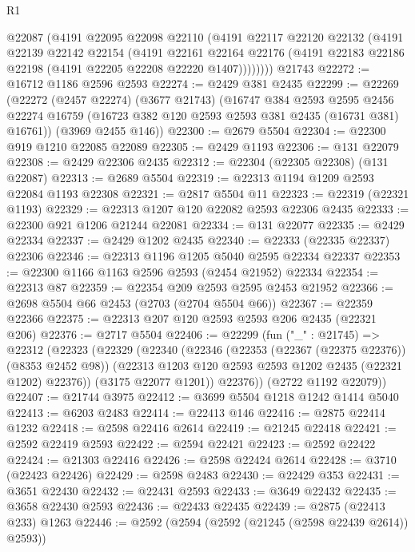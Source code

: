 \begin{lexlean}{R1}
\begin{coremodule}
        @22087
        (@4191
          @22095
          @22098
          @22110
          (@4191
            @22117
            @22120
            @22132
            (@4191
              @22139
              @22142
              @22154
              (@4191
                @22161
                @22164
                @22176
                (@4191 @22183 @22186 @22198 (@4191 @22205 @22208 @22220 @1407))))))))
    @21743
@22272 := @16712 @1186 @2596 @2593
@22274 := @2429 @381 @2435
@22299 := @22269
    (@22272
      (@2457 @22274)
      (@3677 @21743)
      (@16747
        @384
        @2593
        @2595
        @2456
        @22274
        @16759
        (@16723 @382 @120 @2593 @2593 @381 @2435 (@16731 @381) @16761))
      (@3969 @2455 @146))
@22300 := @2679 @5504
@22304 := @22300 @919 @1210 @22085 @22089
@22305 := @2429 @1193
@22306 := @131 @22079
@22308 := @2429 @22306 @2435
@22312 := @22304 (@22305 @22308) (@131 @22087)
@22313 := @2689 @5504
@22319 := @22313 @1194 @1209 @2593 @22084 @1193 @22308
@22321 := @2817 @5504 @11
@22323 := @22319 (@22321 @1193)
@22329 := @22313 @1207 @120 @22082 @2593 @22306 @2435
@22333 := @22300 @921 @1206 @21244 @22081
@22334 := @131 @22077
@22335 := @2429 @22334
@22337 := @2429 @1202 @2435
@22340 := @22333 (@22335 @22337) @22306
@22346 := @22313 @1196 @1205 @5040 @2595 @22334 @22337
@22353 := @22300 @1166 @1163 @2596 @2593 (@2454 @21952) @22334
@22354 := @22313 @87
@22359 := @22354 @209 @2593 @2595 @2453 @21952
@22366 := @2698 @5504 @66 @2453 (@2703 (@2704 @5504 @66))
@22367 := @22359 @22366
@22375 := @22313 @207 @120 @2593 @2593 @206 @2435 (@22321 @206)
@22376 := @2717 @5504
@22406 := @22299
    (fun ("_" : @21745) =>
    @22312
      (@22323
        (@22329
          (@22340
            (@22346
              (@22353 (@22367 (@22375 @22376)) (@8353 @2452 @98))
              (@22313 @1203 @120 @2593 @2593 @1202 @2435 (@22321 @1202) @22376))
            (@3175 @22077 @1201))
          @22376))
      (@2722 @1192 @22079))
@22407 := @21744 @3975
@22412 := @3699 @5504 @1218 @1242 @1414 @5040
@22413 := @6203 @2483
@22414 := @22413 @146
@22416 := @2875 @22414 @1232
@22418 := @2598 @22416 @2614
@22419 := @21245 @22418
@22421 := @2592 @22419 @2593
@22422 := @2594 @22421
@22423 := @2592 @22422
@22424 := @21303 @22416
@22426 := @2598 @22424 @2614
@22428 := @3710 (@22423 @22426)
@22429 := @2598 @2483
@22430 := @22429 @353
@22431 := @3651 @22430
@22432 := @22431 @2593
@22433 := @3649 @22432
@22435 := @3658 @22430 @2593
@22436 := @22433 @22435
@22439 := @2875 (@22413 @233) @1263
@22446 := @2592 (@2594 (@2592 (@21245 (@2598 @22439 @2614)) @2593))

\end{coremodule}
\end{lexlean}
